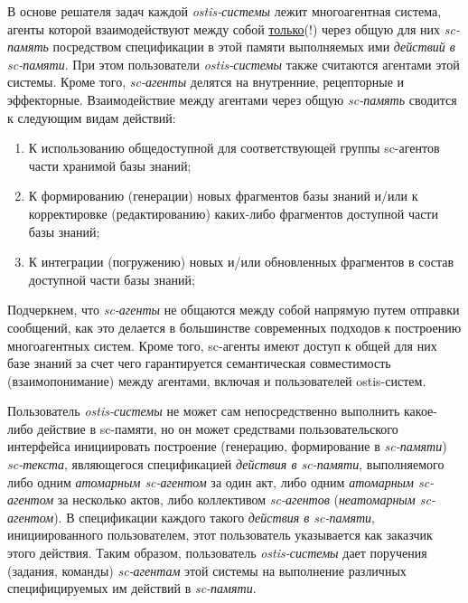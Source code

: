 \begin{textitemize}
	\item В основе решателя задач каждой \textit{ostis-системы} лежит многоагентная система, агенты которой взаимодействуют между собой \uline{только}(!) через общую для них \textit{sc-память} посредством спецификации в этой памяти выполняемых ими \textit{действий в sc-памяти}. При этом пользователи \textit{ostis-системы} также считаются агентами этой системы. Кроме того, \textit{sc-агенты} делятся на внутренние, рецепторные и эффекторные. Взаимодействие между агентами через общую \textit{sc-память} сводится к следующим видам действий:
	\begin{enumerate}
		\item К использованию общедоступной для соответствующей группы sc-агентов части хранимой базы знаний;
		\item К формированию (генерации) новых фрагментов базы знаний и/или к корректировке (редактированию) каких-либо фрагментов доступной части базы знаний;
		\item К интеграции (погружению) новых и/или обновленных фрагментов в состав доступной части базы знаний;
	\end{enumerate}
	
	Подчеркнем, что \textit{sc-агенты} не общаются между собой напрямую путем отправки сообщений, как это делается в большинстве современных подходов к построению многоагентных систем. Кроме того, sc-агенты имеют доступ к общей для них базе знаний за счет чего гарантируется семантическая совместимость (взаимопонимание) между агентами, включая и пользователей ostis-систем.
	
	\item Пользователь \textit{ostis-системы} не может сам непосредственно выполнить какое-либо действие в \mbox{sc-памяти}, но он может средствами пользовательского интерфейса инициировать построение (генерацию, формирование в \textit{sc-памяти}) \textit{sc-текста}, являющегося спецификацией \textit{действия в \mbox{sc-памяти}}, выполняемого либо одним \textit{атомарным sc-агентом} за один акт, либо одним \textit{атомарным sc-агентом} за несколько актов, либо коллективом \textit{sc-агентов} (\textit{неатомарным sc-агентом}). В спецификации каждого такого \textit{действия в sc-памяти}, инициированного пользователем, этот пользователь указывается как заказчик этого действия. Таким образом, пользователь \textit{ostis-системы} дает поручения (задания, команды) \textit{sc-агентам} этой системы на выполнение различных специфицируемых им действий в \textit{sc-памяти}.
	

\end{textitemize}

